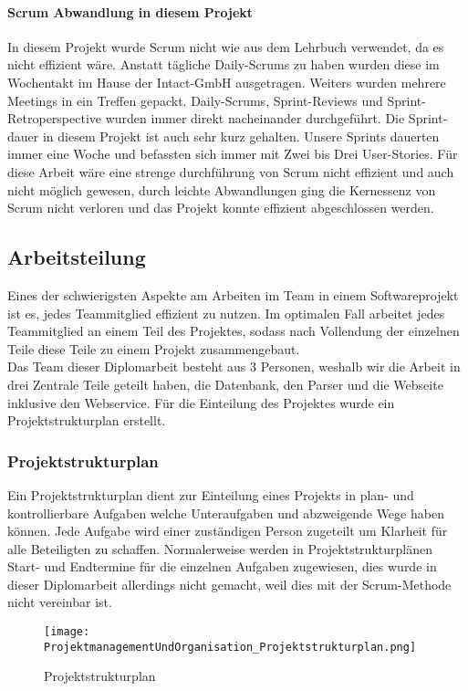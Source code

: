 \paragraph{Scrum Abwandlung in diesem Projekt}
\label{sec:ScrumAbwandlungInDiesemProjekt}
In diesem Projekt wurde Scrum nicht wie aus dem Lehrbuch verwendet, da es nicht effizient wäre. Anstatt tägliche Daily-Scrums zu haben wurden diese im Wochentakt im Hause der Intact-GmbH ausgetragen. Weiters wurden mehrere Meetings in ein Treffen gepackt. Daily-Scrums, Sprint-Reviews und Sprint-Retroperspective wurden immer direkt nacheinander durchgeführt. Die Sprint-dauer in diesem Projekt ist auch sehr kurz gehalten. Unsere Sprints dauerten immer eine Woche und befassten sich immer mit Zwei bis Drei User-Stories. Für diese Arbeit wäre eine strenge durchführung von Scrum nicht effizient und auch nicht möglich gewesen, durch leichte Abwandlungen ging die Kernessenz von Scrum nicht verloren und das Projekt konnte effizient abgeschlossen werden.

\subsection{Arbeitsteilung}
\label{ref:Arbeitsteilung}
Eines der schwierigsten Aspekte am Arbeiten im Team in einem Softwareprojekt ist es, jedes Teammitglied effizient zu nutzen. Im optimalen Fall arbeitet jedes Teammitglied an einem Teil des Projektes, sodass nach Vollendung der einzelnen Teile diese Teile zu einem Projekt zusammengebaut. \\
Das Team dieser Diplomarbeit besteht aus 3 Personen, weshalb wir die Arbeit in drei Zentrale Teile geteilt haben, die Datenbank, den Parser und die Webseite inklusive den Webservice. Für die Einteilung des Projektes wurde ein Projektstrukturplan erstellt.

\subsubsection{Projektstrukturplan}
\label{ref:Projektstrukturplan}
Ein Projektstrukturplan dient zur Einteilung eines Projekts in plan- und kontrollierbare Aufgaben welche Unteraufgaben und abzweigende Wege haben können. Jede Aufgabe wird einer zuständigen Person zugeteilt um Klarheit für alle Beteiligten zu schaffen. Normalerweise werden in Projektstrukturplänen Start- und Endtermine für die einzelnen Aufgaben zugewiesen, dies wurde in dieser Diplomarbeit allerdings nicht gemacht, weil dies mit der Scrum-Methode nicht vereinbar ist.
\begin{figure}[H]
	\texttt{[image: ProjektmanagementUndOrganisation\_Projektstrukturplan.png]}
    \caption{Projektstrukturplan}
    \label{fig:projektStrukturplan}
\end{figure}

 
\pagebreak	
		
